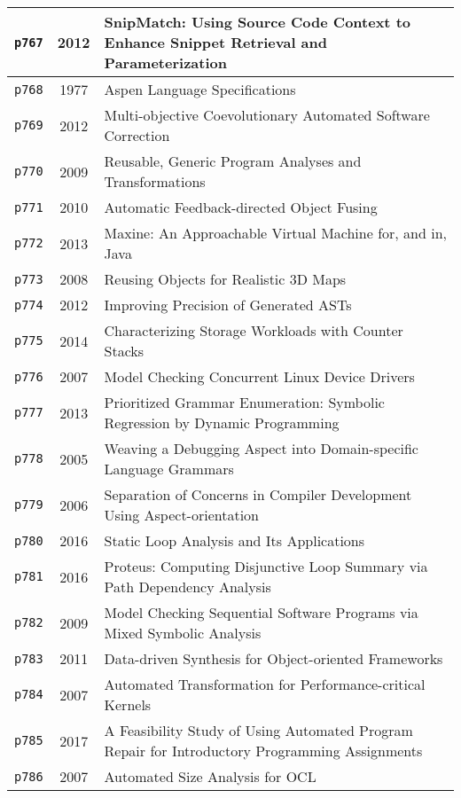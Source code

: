 \begin{longtable}{| c | c | p{16cm} |}
  \hline
  \texttt{p767} & 2012 & SnipMatch: Using Source Code Context to Enhance Snippet Retrieval and Parameterization \\
  \hline
  \texttt{p768} & 1977 & Aspen Language Specifications \\
  \hline
  \texttt{p769} & 2012 & Multi-objective Coevolutionary Automated Software Correction \\
  \hline
  \texttt{p770} & 2009 & Reusable, Generic Program Analyses and Transformations \\
  \hline
  \texttt{p771} & 2010 & Automatic Feedback-directed Object Fusing \\
  \hline
  \texttt{p772} & 2013 & Maxine: An Approachable Virtual Machine for, and in, Java \\
  \hline
  \texttt{p773} & 2008 & Reusing Objects for Realistic 3D Maps \\
  \hline
  \texttt{p774} & 2012 & Improving Precision of Generated ASTs \\
  \hline
  \texttt{p775} & 2014 & Characterizing Storage Workloads with Counter Stacks \\
  \hline
  \texttt{p776} & 2007 & Model Checking Concurrent Linux Device Drivers \\
  \hline
  \texttt{p777} & 2013 & Prioritized Grammar Enumeration: Symbolic Regression by Dynamic Programming \\
  \hline
  \texttt{p778} & 2005 & Weaving a Debugging Aspect into Domain-specific Language Grammars \\
  \hline
  \texttt{p779} & 2006 & Separation of Concerns in Compiler Development Using Aspect-orientation \\
  \hline
  \texttt{p780} & 2016 & Static Loop Analysis and Its Applications \\
  \hline
  \texttt{p781} & 2016 & Proteus: Computing Disjunctive Loop Summary via Path Dependency Analysis \\
  \hline
  \texttt{p782} & 2009 & Model Checking Sequential Software Programs via Mixed Symbolic Analysis \\
  \hline
  \texttt{p783} & 2011 & Data-driven Synthesis for Object-oriented Frameworks \\
  \hline
  \texttt{p784} & 2007 & Automated Transformation for Performance-critical Kernels \\
  \hline
  \texttt{p785} & 2017 & A Feasibility Study of Using Automated Program Repair for Introductory Programming Assignments \\
  \hline
  \texttt{p786} & 2007 & Automated Size Analysis for OCL \\

\end{longtable}
